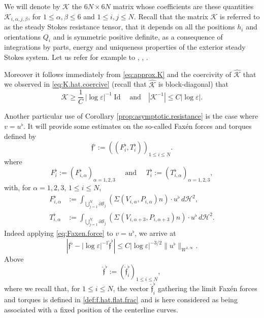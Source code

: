 \documentclass[10pt]{amsart}
\let\eps\varepsilon
\DeclareMathOperator{\Id}{Id}
\theoremstyle{definition}
\theoremstyle{remark}
\let\oldbigcup\bigcup
\begin{document}
We will denote by $\mathcal K$ the $6N \times 6N$ matrix whose coefficients are these quantities $\mathcal K_{i,\alpha,j,\beta}$, for $1 \leq \alpha,\beta \leq 6$ and $1 \leq i,j \leq N$.
Recall that the matrix $\mathcal K$ is referred to as the steady Stokes resistance tensor, that it depends on all the positions $h_i$ and orientations $Q_i$ and is symmetric positive definite, as a consequence of integrations by parts, energy and uniqueness properties of the exterior steady Stokes system. Let us refer for example to \cite[Chap.\,2]{Kim-Karilla}, \cite[Chap.\,5]{Galdi}, \cite[Chap.\,2 \& 3]{Lady}.

Moreover it follows immediately from \eqref{eq:approx.K} and the coercivity of $\hat{\mathcal K}$ that we observed in \eqref{eq:K.hat.coercive} (recall that $\hat{\mathcal K}$ is block-diagonal) that
\begin{equation}
\mathcal K \geq \frac1C\, \left|\log \eps\right|^{-1} \Id \quad \text{and} \quad | \mathcal K^{-1} |
\leq C {\left|\log \eps\right|}.
\label{eq:K.coercive}
\end{equation}

Another particular use of Corollary \ref{prop:asymptotic.resistance}
is the case where $v=u^\flat$.
It will provide some estimates on the so-called Faxén forces and torques defined by
\begin{equation}\label{clour}
\mathfrak{f}^\flat := ((F^\flat_{i},T^\flat_{i}))_{1 \leq i \leq N}.
\end{equation}
where
\begin{equation}
\label{fab3}
F^\flat_{i} := (F^\flat_{i,\alpha})_{\alpha=1,2,3} \quad \text{ and } \quad T^\flat_{i} := (T^\flat_{i,\alpha})_{\alpha=1,2,3},
\end{equation}
with, for $\alpha=1,2,3$, $1\leq i \leq N$,
\begin{align}
\label{fab1}
F^\flat_{i,\alpha} &:=
\int_{\oldbigcup_{j=1}^N \partial \mathcal S_j } (\Sigma (V_{i,\alpha}, P_{i,\alpha}) n) \cdot u^\flat \, d\mathcal{H}^2,
\\ \label{fab2}
T^\flat_{i,\alpha} &:=
\int_{\oldbigcup_{j=1}^N \partial \mathcal S_j } (\Sigma (V_{i, \alpha +3 }, P_{i, \alpha+3}) n) \cdot u^\flat \, d\mathcal{H}^2.
\end{align}
Indeed
applying \eqref{eq:Faxen.force} to $v=u^\flat$, we arrive at
\begin{equation} \label{ofint}
| \mathfrak{f}^\flat -\left|\log \eps\right|^{-1} \hat{\mathfrak f}^\flat|
\leq C \left|\log \eps\right|^{-3/2} \|u^\flat\|_{W^{1,\infty}}.
\end{equation}
Above
\[
{\hat{\mathfrak{f}}^\flat }
:= (\hat{\mathfrak{f}}_i^\flat)_{1 \leq i \leq N}, \]
where we recall that, for $1 \leq i \leq N$, the vector $\hat{\mathfrak{f}}^\flat_{i} $ gathering the limit Faxén forces and torques is defined in \eqref{def:f.hat.flat.frac} and is here considered as {being} associated with a fixed position of the centerline curves.
\end{document}
